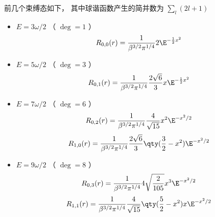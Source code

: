 前几个束缚态如下， 其中球谐函数产生的简并数为 $\sum_l (2l + 1)$
\begin{itemize}
\item $E = 3 \omega /2$ （ $\deg  = 1$ ）
\begin{equation}
R_{0,0}(r) = \frac{1}{\beta^{3/2} \pi^{1/4}} 2\E^{-\frac12 x^2}
\end{equation}

\item $E = 5 \omega /2$ （ $\deg  = 3$ ）
\begin{equation}
R_{0,1}(r) = \frac{1}{\beta^{3/2} \pi^{1/4}} \frac{2\sqrt 6}{3} x \E^{-\frac12 x^2}
\end{equation}

\item $E = 7 \omega /2$ （ $\deg  = 6$ ）
\begin{equation}
R_{0,2}(r) = \frac{1}{\beta^{3/2} \pi^{1/4}} \frac{4}{\sqrt{15}} x^2 \E^{- x^2/2}
\end{equation}
\begin{equation}
R_{1,0}(r) = \frac{1}{\beta^{3/2} \pi^{1/4}} \frac{2\sqrt 6}{3} \qty(\frac32 - x^2) \E^{-x^2/2}
\end{equation}

\item $E = 9 \omega /2$ （ $\deg  = 8$ ）
\begin{equation}
R_{0,3}(r) = \frac{1}{\beta^{3/2} \pi^{1/4}} 4\sqrt{\frac{2}{105}} x^3 \E^{-x^2/2}
\end{equation}
\begin{equation}
R_{1,1}(r) = \frac{1}{\beta^{3/2} \pi^{1/4}} \frac{4}{\sqrt{15}} \qty(\frac52 - x^2) x \E^{-x^2/2}
\end{equation}
\end{itemize}
